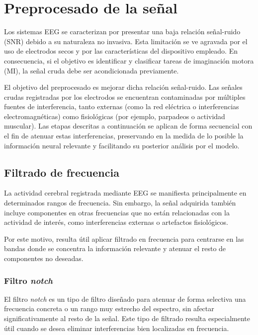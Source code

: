 \section{Preprocesado de la señal}
\label{sec:preprocesado}

Los sistemas EEG se caracterizan por presentar una baja relación señal-ruido (SNR) debido a su naturaleza no invasiva. Esta limitación se ve agravada por el uso de electrodos secos y por las características del dispositivo empleado. En consecuencia, si el objetivo es identificar y clasificar tareas de imaginación motora (MI), la señal cruda debe ser acondicionada previamente.

El objetivo del preprocesado es mejorar dicha relación señal-ruido. Las señales crudas registradas por los electrodos se encuentran contaminadas por múltiples fuentes de interferencia, tanto externas (como la red eléctrica o interferencias electromagnéticas) como fisiológicas (por ejemplo, parpadeos o actividad muscular). Las etapas descritas a continuación se aplican de forma secuencial con el fin de atenuar estas interferencias, preservando en la medida de lo posible la información neural relevante y facilitando su posterior análisis por el modelo.

\subsection{Filtrado de frecuencia}
\label{subsec:FiltradoFrecuencia}
La actividad cerebral registrada mediante EEG se manifiesta principalmente en determinados rangos de frecuencia. Sin embargo, la señal adquirida también incluye componentes en otras frecuencias que no están relacionadas con la actividad de interés, como interferencias externas o artefactos fisiológicos.

Por este motivo, resulta útil aplicar filtrado en frecuencia para centrarse en las bandas donde se concentra la información relevante y atenuar el resto de componentes no deseadas. 

\subsubsection{Filtro \textit{notch}}

El filtro \textit{notch} es un tipo de filtro diseñado para atenuar de forma selectiva una frecuencia concreta o un rango muy estrecho del espectro, sin afectar significativamente al resto de la señal. Este tipo de filtrado resulta especialmente útil cuando se desea eliminar interferencias bien localizadas en frecuencia.

